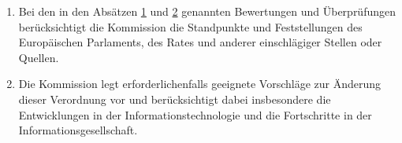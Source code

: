 \begin{enumerate}
  \item Bei den in den Absätzen \hyperref[itm:97-1]{1} und \hyperref[itm:97-2]{2} genannten Bewertungen und
   Überprüfungen berücksichtigt die Kommission die Standpunkte und Feststellungen des Europäischen Parlaments, des
   Rates und anderer einschlägiger Stellen oder Quellen.%
  \label{itm:97-4}

  \item Die Kommission legt erforderlichenfalls geeignete Vorschläge zur Änderung dieser Verordnung vor und
   berücksichtigt dabei insbesondere die Entwicklungen in der Informationstechnologie und die Fortschritte in der
   Informationsgesellschaft.%
  \label{itm:97-5}

\end{enumerate}


